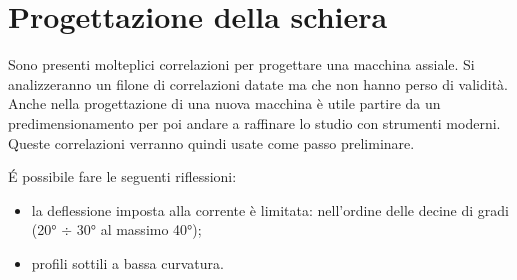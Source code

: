 \section{Progettazione della schiera}
Sono presenti molteplici correlazioni per progettare una macchina assiale. Si analizzeranno un filone di correlazioni datate ma che non hanno perso di validità. Anche nella progettazione di una nuova macchina è utile partire da un predimensionamento per poi andare a raffinare lo studio con strumenti moderni. Queste correlazioni verranno quindi usate come passo preliminare.

\'E possibile fare le seguenti riflessioni:
\begin{itemize}
\item la deflessione imposta alla corrente è limitata: nell'ordine delle decine di gradi (\ang{20} $\div$ \ang{30} al massimo \ang{40});
\item profili sottili a bassa curvatura.
\end{itemize}

